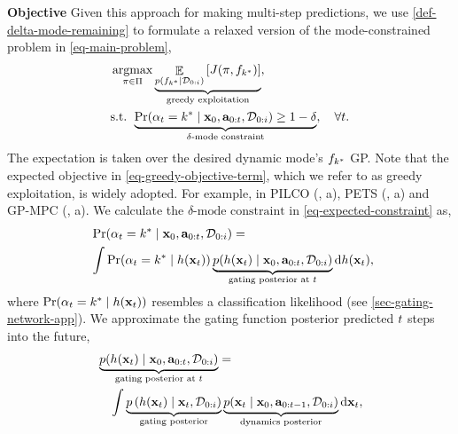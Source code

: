 \documentclass[twoside]{article}
\DeclareMathOperator{\E}{\mathbb{E}}
\newcommand{\state}{\ensuremath{\mathbf{x}}}
\newcommand{\dataset}{\ensuremath{\mathcal{D}}}
\newcommand{\modeVar}{\ensuremath{\alpha}}
\newcommand{\gatingFunc}{\ensuremath{h}}
\DeclareMathOperator*{\argmax}{argmax}
\begin{document}
\textbf{Objective}
Given this approach for making multi-step predictions, we use \cref{def-delta-mode-remaining}
to formulate a relaxed version of the mode-constrained problem in \cref{eq-main-problem},
\begin{subequations} \label{eq-greedy-objective}
\begin{align}
&\argmax_{\pi \in \Pi}
\underbrace{\E_{p(\dynamicsFunc_{\desiredMode} \mid \dataset_{0:i})} \left[ J(\pi, \dynamicsFunc_{\desiredMode}) \right]}_{\text{greedy exploitation}},
\label{eq-greedy-objective-term}
\\
&\text{s.t. }
\underbrace{\Pr(\modeVar_{\timeInd} = \desiredMode \mid \state_{0}, \action_{0:t}, \dataset_{0:i})
\geq 1-\delta}_{\delta\text{-mode constraint}}, \quad \forall \timeInd \label{eq-expected-constraint}.
\end{align}
\end{subequations}
The expectation is taken over the desired dynamic mode's \(f_{k^{*}}\) GP.
Note that the expected objective in \cref{eq-greedy-objective-term}, which we refer to as greedy exploitation, is widely adopted.
For example, in PILCO (, a), PETS (, a) and GP-MPC (, a).
We calculate the \(\delta\text{-mode constraint}\) in \cref{eq-expected-constraint} as,
\begin{align} \label{eq--delta-mode-constraint-approx}
&\Pr (\modeVar_{\timeInd}=\desiredMode \mid \state_{0}, \action_{0:\timeInd}, \dataset_{0:i}) =   \\
\ &\int \Pr(\modeVar_{\timeInd}=\desiredMode \mid \gatingFunc(\state_{\timeInd}))
\underbrace{p(\gatingFunc(\state_{\timeInd}) \mid \state_{0}, \action_{0:\timeInd}, \dataset_{0:i})}_{\text{gating posterior at \timeInd}}
\text{d} \gatingFunc(\state_{\timeInd}), \nonumber
\end{align}
where \(\Pr(\modeVar_{\timeInd}=\desiredMode \mid \gatingFunc(\state_{\timeInd}))\) resembles a classification likelihood (see \cref{sec-gating-network-app}).
We approximate the gating function posterior predicted \(t\) steps into the future,
\begin{align}
&\underbrace{p(\gatingFunc(\state_{\timeInd}) \mid \state_{0}, \action_{0:\timeInd}, \dataset_{0:i})}_{\text{gating posterior at \timeInd}}
= \nonumber \\
&\quad \int
\underbrace{p\left(\gatingFunc(\state_{\timeInd}) \mid \state_{\timeInd}, \dataset_{0:i} \right)}_{\text{gating posterior}}
\underbrace{p(\state_{\timeInd} \mid \state_{0}, \action_{0:\timeInd-1}, \mathcal{D}_{0:i})}_{\text{dynamics posterior}} \text{d} \state_{\timeInd},
\end{align}
\end{document}
